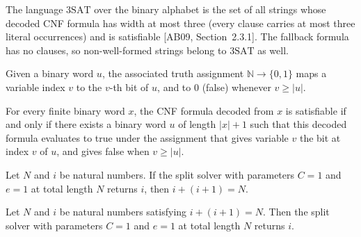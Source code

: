 \begin{definition}
\label{Complexity.SAT3}
\leanok
{}
The language $\mathrm{3SAT}$ over the binary alphabet is the set of all strings
whose decoded CNF formula has width at most three (every clause carries at most
three literal occurrences) and is satisfiable [AB09, Section~2.3.1]. The fallback
formula has no clauses, so non-well-formed strings belong to $\mathrm{3SAT}$ as
well.
\end{definition}

\begin{definition}
\label{Complexity.satAssignment}
\leanok
Given a binary word $u$, the associated truth assignment
$\mathbb{N} \to \{0,1\}$ maps a variable index $v$ to the $v$-th bit of $u$, and to
$0$ (false) whenever $v \ge |u|$.
\end{definition}

\begin{lemma}
\label{Complexity.sat_certificate}
\leanok
{}
For every finite binary word $x$, the CNF formula decoded from $x$ is satisfiable if and
only if there exists a binary word $u$ of length $|x|+1$ such that this decoded formula
evaluates to true under the assignment that gives variable $v$ the bit at index $v$ of
$u$, and gives false when $v\ge |u|$.
\end{lemma}

\begin{lemma}
\label{Complexity.sat_split_some}
\leanok
{}
Let $N$ and $i$ be natural numbers. If the split solver with parameters $C=1$ and $e=1$
at total length $N$ returns $i$, then $i+(i+1)=N$.
\end{lemma}

\begin{lemma}
\label{Complexity.sat_split_exists}
\leanok
{}
Let $N$ and $i$ be natural numbers satisfying $i+(i+1)=N$. Then the split solver with
parameters $C=1$ and $e=1$ at total length $N$ returns $i$.
\end{lemma}

